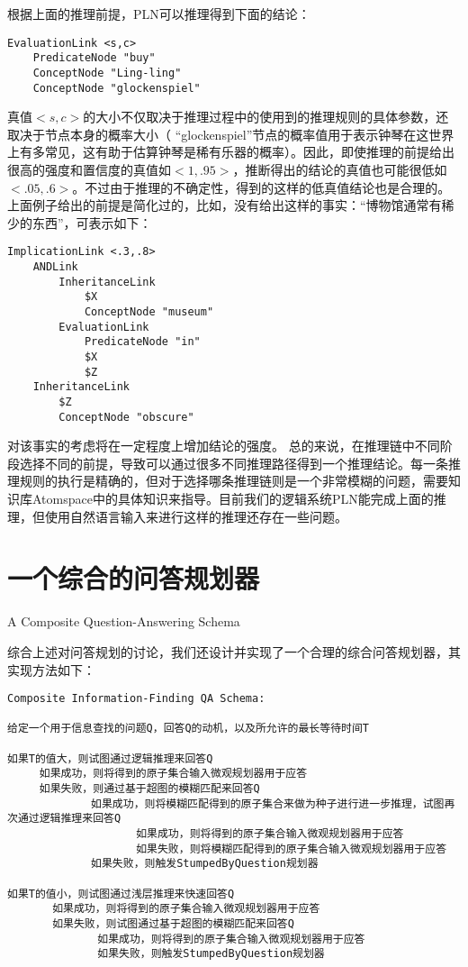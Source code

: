 根据上面的推理前提，PLN可以推理得到下面的结论：

\begin{verbatim}
EvaluationLink <s,c>
	PredicateNode "buy"
	ConceptNode "Ling-ling"
	ConceptNode "glockenspiel"
\end{verbatim}

真值$<s,c>$的大小不仅取决于推理过程中的使用到的推理规则的具体参数，还取决于节点本身的概率大小（ “glockenspiel”节点的概率值用于表示钟琴在这世界上有多常见，这有助于估算钟琴是稀有乐器的概率）。因此，即使推理的前提给出很高的强度和置信度的真值如$<1,.95>$，推断得出的结论的真值也可能很低如$<.05,.6>$。不过由于推理的不确定性，得到的这样的低真值结论也是合理的。
上面例子给出的前提是简化过的，比如，没有给出这样的事实：“博物馆通常有稀少的东西”，可表示如下：

\begin{verbatim}
ImplicationLink <.3,.8>
	ANDLink
		InheritanceLink
			$X
			ConceptNode "museum"
		EvaluationLink
			PredicateNode "in"
			$X
			$Z
	InheritanceLink
		$Z
		ConceptNode "obscure"
\end{verbatim}

对该事实的考虑将在一定程度上增加结论的强度。
总的来说，在推理链中不同阶段选择不同的前提，导致可以通过很多不同推理路径得到一个推理结论。每一条推理规则的执行是精确的，但对于选择哪条推理链则是一个非常模糊的问题，需要知识库Atomspace中的具体知识来指导。目前我们的逻辑系统PLN能完成上面的推理，但使用自然语言输入来进行这样的推理还存在一些问题。


\section{一个综合的问答规划器}{A Composite Question-Answering Schema}

综合上述对问答规划的讨论，我们还设计并实现了一个合理的综合问答规划器，其实现方法如下：

\begin{verbatim}
Composite Information-Finding QA Schema:

给定一个用于信息查找的问题Q，回答Q的动机，以及所允许的最长等待时间T

如果T的值大，则试图通过逻辑推理来回答Q
     如果成功，则将得到的原子集合输入微观规划器用于应答
     如果失败，则通过基于超图的模糊匹配来回答Q
             如果成功，则将模糊匹配得到的原子集合来做为种子进行进一步推理，试图再次通过逻辑推理来回答Q
                    如果成功，则将得到的原子集合输入微观规划器用于应答
                    如果失败，则将模糊匹配得到的原子集合输入微观规划器用于应答
             如果失败，则触发StumpedByQuestion规划器
     
如果T的值小，则试图通过浅层推理来快速回答Q
       如果成功，则将得到的原子集合输入微观规划器用于应答
       如果失败，则试图通过基于超图的模糊匹配来回答Q
              如果成功，则将得到的原子集合输入微观规划器用于应答
              如果失败，则触发StumpedByQuestion规划器

\end{verbatim}

